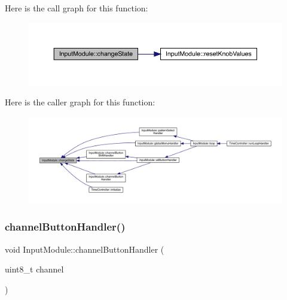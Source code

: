 Here is the call graph for this function\+:
\nopagebreak
\begin{figure}[H]
\begin{center}
\leavevmode
\includegraphics[width=350pt]{class_input_module_ac6242c4331441ba020d2fca7bff7a401_cgraph}
\end{center}
\end{figure}
Here is the caller graph for this function\+:
\nopagebreak
\begin{figure}[H]
\begin{center}
\leavevmode
\includegraphics[width=350pt]{class_input_module_ac6242c4331441ba020d2fca7bff7a401_icgraph}
\end{center}
\end{figure}
\mbox{\label{class_input_module_a62ad05f2e4880aeae014d99ecfcd494d}} 
\subsubsection{\texorpdfstring{channel\+Button\+Handler()}{channelButtonHandler()}}
{\footnotesize\ttfamily void Input\+Module\+::channel\+Button\+Handler (\begin{DoxyParamCaption}\item[{uint8\+\_\+t}]{channel }\end{DoxyParamCaption})}

